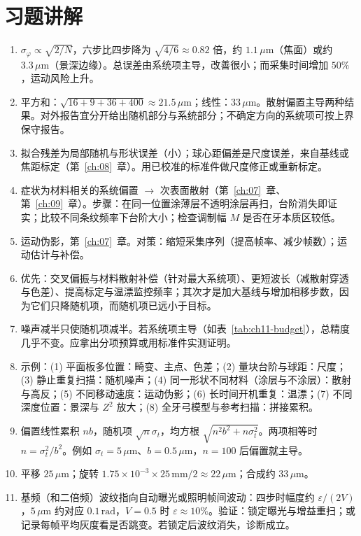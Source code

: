 \section{习题讲解}
\label{sec:ch11-solutions}

\begin{enumerate}
  \item $\sigma_\varphi\propto\sqrt{2/N}$，六步比四步降为 $\sqrt{4/6}\approx0.82$ 倍，约 $1.1\,\mu\mathrm{m}$（焦面）或约 $3.3\,\mu\mathrm{m}$（景深边缘）。总误差由系统项主导，改善很小；而采集时间增加 $50\%$，运动风险上升。
  \item 平方和：$\sqrt{16+9+36+400}\approx21.5\,\mu\mathrm{m}$；线性：$33\,\mu\mathrm{m}$。散射偏置主导两种结果。对外报告宜分开给出随机部分与系统部分；不确定方向的系统项可按上界保守报告。
  \item 拟合残差为局部随机与形状误差（小）；球心距偏差是尺度误差，来自基线或焦距标定（第~\ref{ch:08}~章）。用已校准的标准件做尺度修正或重新标定。
  \item 症状为材料相关的系统偏置 $\to$ 次表面散射（第~\ref{ch:07}~章、第~\ref{ch:09}~章）。步骤：在同一位置涂薄层不透明涂层再扫，台阶消失即证实；比较不同条纹频率下台阶大小；检查调制幅 $M$ 是否在牙本质区较低。
  \item 运动伪影，第~\ref{ch:07}~章。对策：缩短采集序列（提高帧率、减少帧数）；运动估计与补偿。
  \item 优先：交叉偏振与材料散射补偿（针对最大系统项）、更短波长（减散射穿透与色差）、提高标定与温漂监控频率；其次才是加大基线与增加相移步数，因为它们只降随机项，而随机项已远小于目标。
  \item 噪声减半只使随机项减半。若系统项主导（如表~\ref{tab:ch11-budget}），总精度几乎不变。应拿出分项预算或用标准件实测证明。
  \item 示例：(1) 平面板多位置：畸变、主点、色差；(2) 量块台阶与球距：尺度；(3) 静止重复扫描：随机噪声；(4) 同一形状不同材料（涂层与不涂层）：散射与高反；(5) 不同移动速度：运动伪影；(6) 长时间开机重复：温漂；(7) 不同深度位置：景深与 $Z^2$ 放大；(8) 全牙弓模型与参考扫描：拼接累积。
  \item 偏置线性累积 $nb$，随机项 $\sqrt n\sigma_t$，均方根 $\sqrt{n^2b^2+n\sigma_t^2}$。两项相等时 $n=\sigma_t^2/b^2$。例如 $\sigma_t=5\,\mu\mathrm{m}$、$b=0.5\,\mu\mathrm{m}$，$n=100$ 后偏置就主导。
  \item 平移 $25\,\mu\mathrm{m}$；旋转 $1.75\times10^{-3}\times25\,\mathrm{mm}/2\approx22\,\mu\mathrm{m}$；合成约 $33\,\mu\mathrm{m}$。
  \item 基频（和二倍频）波纹指向自动曝光或照明帧间波动：四步时幅度约 $\varepsilon/(2V)$，$5\,\mu\mathrm{m}$ 约对应 $0.1\,\mathrm{rad}$，$V=0.5$ 时 $\varepsilon\approx10\%$。验证：锁定曝光与增益重扫；或记录每帧平均灰度看是否跳变。若锁定后波纹消失，诊断成立。

\end{enumerate}
